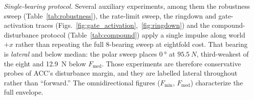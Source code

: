 \documentclass[conference]{IEEEtran}
\begin{document}
\emph{Single-bearing protocol.} Several auxiliary experiments, among them the robustness sweep (Table~\ref{tab:robustness}), the rate-limit sweep, the ringdown and gate-activation traces (Figs.~\ref{fig:gate_activation},~\ref{fig:ringdown}) and the compound-disturbance protocol (Table~\ref{tab:compound}) apply a single impulse along world $+x$ rather than repeating the full \num{8}-bearing sweep at eightfold cost. That bearing is \emph{lateral} and below median: the polar sweep places $\SI{0}{\degree}$ at $\SI{95.5}{N}$, third-weakest of the eight and \SI{12.9}{N} below $F_{\text{med}}$. Those experiments are therefore conservative probes of ACC's disturbance margin, and they are labelled lateral throughout rather than ``forward.'' The omnidirectional figures ($F_{\min}$, $F_{\text{med}}$) characterize the full envelope.
\end{document}
